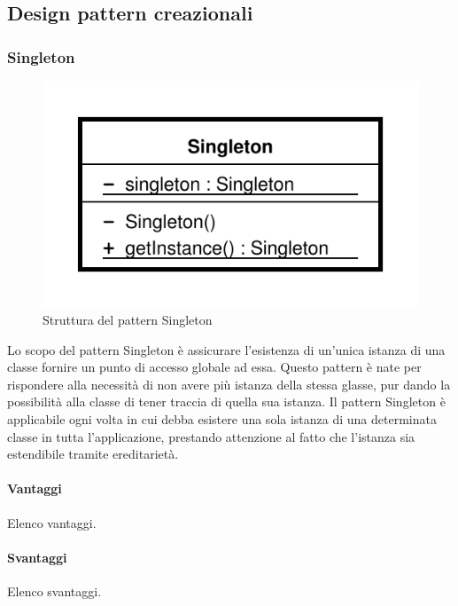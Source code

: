 \documentclass[../SpecificaTecnica.tex]{subfiles}
\begin{document}
\begin{appendices}
	\subsection{Design pattern creazionali}
		\subsubsection{Singleton}
			\begin{figure}[!h]
				\centering
				\includegraphics[scale=0.5]{pattern/singleton}
				\caption{Struttura del pattern Singleton}
				\label{fig:Struttura_Singleton}
			\end{figure}
			
			Lo scopo del pattern Singleton è assicurare l'esistenza di un'unica istanza di una classe fornire un punto di accesso globale ad essa. Questo pattern è nate per rispondere alla necessità di non avere più istanza della stessa glasse, pur dando la possibilità alla classe di tener traccia di quella sua istanza. Il pattern Singleton è applicabile ogni volta in cui debba esistere una sola istanza di una determinata classe in tutta l'applicazione, prestando attenzione al fatto che l'istanza sia estendibile tramite ereditarietà.
			\paragraph{Vantaggi}
				Elenco vantaggi.
			\paragraph{Svantaggi}
				Elenco svantaggi.
				

\end{appendices}
\end{document}
